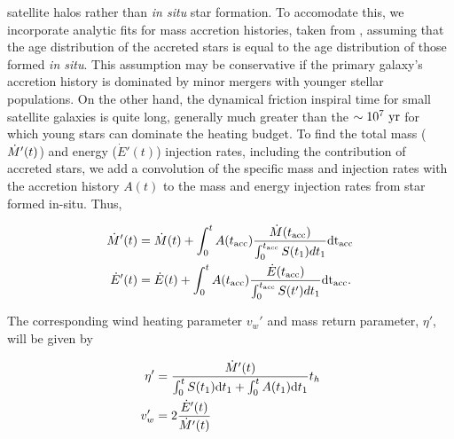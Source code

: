   satellite halos rather than {\it in situ} star formation.  To
  accomodate this, we incorporate analytic fits for mass accretion
  histories, taken from \citet[eqs.~21-23]{MosterNaab+:2013a},
  assuming that the age distribution of the accreted stars is equal to
  the age distribution of those formed {\it in situ}.  This assumption
  may be conservative if the primary galaxy's accretion history is
  dominated by minor mergers with younger stellar populations.  On the
  other hand, the dynamical friction inspiral time for small satellite
  galaxies is quite long, generally much greater than the $\sim
  10^7~{\rm yr}$ for which young stars can dominate the heating
  budget.  To find the total mass ($\dot{M}'(t)$) and energy
  ($\dot{E}'(t)$) injection rates, including the contribution of
  accreted stars, we add a convolution of the specific mass and
  injection rates with the accretion history $A(t)$ to the mass and
  energy injection rates from star formed in-situ.  Thus,

\begin{align}
\dot{M} '(t)&=\dot{M}(t)+\int_{0}^{t} A(t_{\rm acc}) \frac{\dot{M}(t_{\rm acc})}
{\int_{0}^{t_{\rm acc}} S(t_1) dt_1} {\rm dt_{ acc}}\\
\dot{E}'(t)&=\dot{E}(t)+\int_{0}^{t} A(t_{\rm acc}) \frac{\dot{E}(t_{\rm acc})}
{\int_{0}^{t_{\rm acc}} S(t') dt_1} {\rm dt_{acc}}.
\end{align}

The corresponding wind heating parameter $v_w'$ and mass return
parameter, $\eta'$, will be given by

\begin{align}
\eta'&=\frac{\dot{M}'(t)}{\int_0^t S(t_1) {\rm d}t_1+\int_0^t A(t_1) {\rm
    d}t_1} t_h\\
v_w'&=2 \frac{\dot{E}'(t)}{\dot{M}'(t)}
\end{align}



